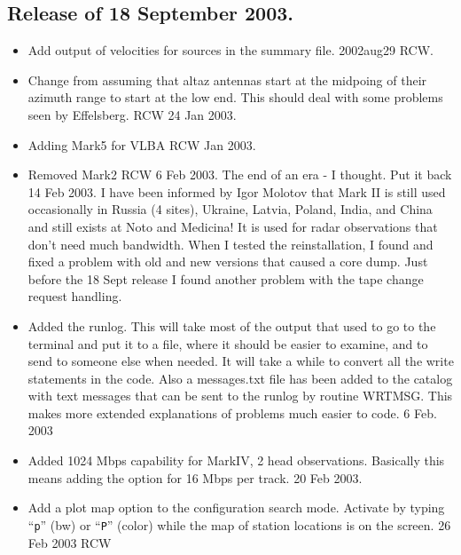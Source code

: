 \documentclass{report}
\begin{document}
\subsection{\label{SSSEC:18SEP2003}Release of 18 September 2003.}

\begin{itemize}

\item  Add output of velocities for sources in the summary file.
2002aug29 RCW.

\item  Change from assuming that altaz antennas start at the midpoing
of their azimuth range to start at the low end.  This should deal
with some problems seen by Effelsberg.  RCW  24 Jan 2003.

\item  Adding Mark5 for VLBA  RCW Jan 2003.

\item Removed Mark2 RCW 6 Feb 2003.  The end of an era - I thought.
Put it back 14 Feb 2003.  I have been informed by Igor Molotov that
Mark II is still used occasionally in Russia (4 sites), Ukraine,
Latvia, Poland, India, and China and still exists at Noto and
Medicina!  It is used for radar observations that don't need much
bandwidth.  When I tested the reinstallation, I found and fixed a
problem with old and new versions that caused a core dump.
Just before the 18 Sept release I found another problem with the
tape change request handling.

\item  Added the runlog.  This will take most of the output that used
to go to the terminal and put it to a file, where it should be easier
to examine, and to send to someone else when needed.  It will take
a while to convert all the write statements in the code.  Also a
messages.txt file has been added to the catalog with text messages
that can be sent to the runlog by routine WRTMSG.  This makes more
extended explanations of problems much easier to code.  6 Feb. 2003

\item  Added 1024 Mbps capability for MarkIV, 2 head observations.
Basically this means adding the option for 16 Mbps per track.
20 Feb 2003.

\item  Add a plot map option to the configuration search mode.  Activate
by typing ``{\tt p}'' (bw) or ``{\tt P}'' (color) while the map
of station locations is on the screen.  26 Feb 2003  RCW


\end{itemize}
\end{document}
